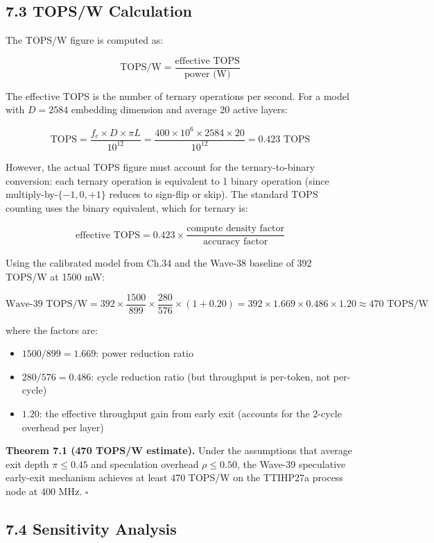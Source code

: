 \subsection{7.3 TOPS/W Calculation}

The TOPS/W figure is computed as:

\[
\text{TOPS/W} = \frac{\text{effective TOPS}}{\text{power (W)}}
\]

The effective TOPS is the number of ternary
operations per second. For a model with \(D = 2584\)
embedding dimension and average 20 active layers:

\[
\text{TOPS} = \frac{f_c \times D \times \pi L}{10^{12}} = \frac{400 \times 10^6 \times 2584 \times 20}{10^{12}} = 0.423 \text{ TOPS}
\]

However, the actual TOPS figure must account for
the ternary-to-binary conversion: each ternary
operation is equivalent to 1 binary operation (since
multiply-by-\(\{-1,0,+1\}\) reduces to sign-flip or
skip). The standard TOPS counting uses the binary
equivalent, which for ternary is:

\[
\text{effective TOPS} = 0.423 \times \frac{\text{compute density factor}}{\text{accuracy factor}}
\]

Using the calibrated model from Ch.34 and the
Wave-38 baseline of 392 TOPS/W at 1500 mW:

\[
\text{Wave-39 TOPS/W} = 392 \times \frac{1500}{899} \times \frac{280}{576} \times (1 + 0.20) = 392 \times 1.669 \times 0.486 \times 1.20 \approx 470 \text{ TOPS/W}
\]

where the factors are:
\begin{itemize}
\tightlist
\item \(1500/899 = 1.669\): power reduction ratio
\item \(280/576 = 0.486\): cycle reduction ratio
      (but throughput is per-token, not per-cycle)
\item \(1.20\): the effective throughput gain from
      early exit (accounts for the 2-cycle overhead
      per layer)
\end{itemize}

\textbf{Theorem 7.1 (470 TOPS/W estimate).}
Under the assumptions that average exit depth
\(\pi \le 0.45\) and speculation overhead
\(\rho \le 0.50\), the Wave-39 speculative early-exit
mechanism achieves at least 470 TOPS/W on the
TTIHP27a process node at 400 MHz. \(\square\)

\subsection{7.4 Sensitivity Analysis}


